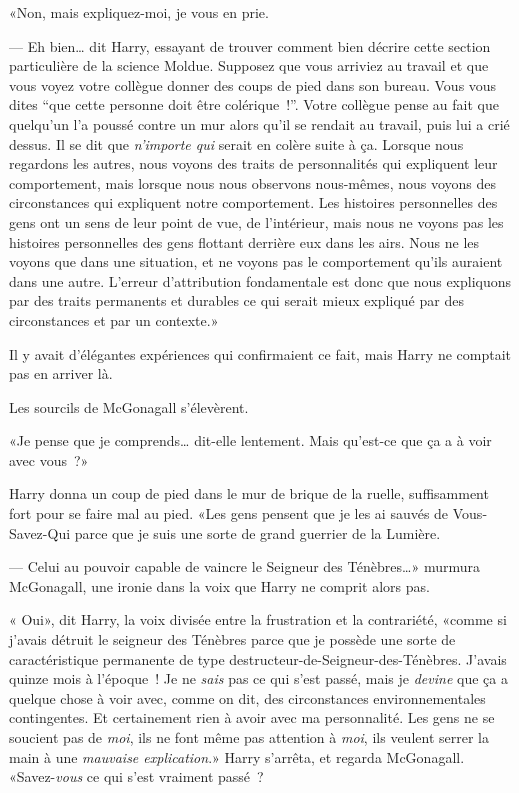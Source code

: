 «Non, mais expliquez-moi, je vous en prie.

--- Eh bien… dit Harry, essayant de trouver comment bien décrire cette section particulière de la science Moldue. Supposez que vous arriviez au travail et que vous voyez votre collègue donner des coups de pied dans son bureau. Vous vous dites “que cette personne doit être colérique~!”. Votre collègue pense au fait que quelqu'un l'a poussé contre un mur alors qu'il se rendait au travail, puis lui a crié dessus. Il se dit que \emph{n'importe qui} serait en colère suite à ça. Lorsque nous regardons les autres, nous voyons des traits de personnalités qui expliquent leur comportement, mais lorsque nous nous observons nous-mêmes, nous voyons des circonstances qui expliquent notre comportement. Les histoires personnelles des gens ont un sens de leur point de vue, de l'intérieur, mais nous ne voyons pas les histoires personnelles des gens flottant derrière eux dans les airs. Nous ne les voyons que dans une situation, et ne voyons pas le comportement qu'ils auraient dans une autre. L'erreur d'attribution fondamentale est donc que nous expliquons par des traits permanents et durables ce qui serait mieux expliqué par des circonstances et par un contexte.»

Il y avait d'élégantes expériences qui confirmaient ce fait, mais Harry ne comptait pas en arriver là.

Les sourcils de McGonagall s'élevèrent.

«Je pense que je comprends… dit-elle lentement. Mais qu'est-ce que ça a à voir avec vous~?»

Harry donna un coup de pied dans le mur de brique de la ruelle, suffisamment fort pour se faire mal au pied.
«Les gens pensent que je les ai sauvés de Vous-Savez-Qui parce que je suis une sorte de grand guerrier de la Lumière.

--- Celui au pouvoir capable de vaincre le Seigneur des Ténèbres…» murmura McGonagall, une ironie dans la voix que Harry ne comprit alors pas.

« Oui», dit Harry, la voix divisée entre la frustration et la contrariété, «comme si j'avais détruit le seigneur des Ténèbres parce que je possède une sorte de caractéristique permanente de type destructeur-de-Seigneur-des-Ténèbres. J'avais quinze mois à l'époque~! Je ne \emph{sais} pas ce qui s'est passé, mais je \emph{devine} que ça a quelque chose à voir avec, comme on dit, des circonstances environnementales contingentes. Et certainement rien à avoir avec ma personnalité. Les gens ne se soucient pas de \emph{moi}, ils ne font même pas attention à \emph{moi}, ils veulent serrer la main à une \emph{mauvaise explication}.» Harry s'arrêta, et regarda McGonagall. «Savez-\emph{vous} ce qui s'est vraiment passé~?

